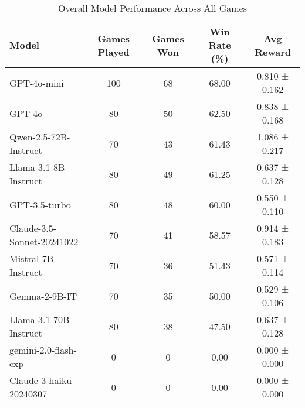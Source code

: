 \begin{table}[htbp]
\centering
\caption{Overall Model Performance Across All Games}
\begin{tabular}{lcccc}
\toprule
Model & Games Played & Games Won & Win Rate (\%) & Avg Reward \\
\midrule
GPT-4o-mini & 100 & 68 & 68.00 & 0.810 ± 0.162 \\
GPT-4o & 80 & 50 & 62.50 & 0.838 ± 0.168 \\
Qwen-2.5-72B-Instruct & 70 & 43 & 61.43 & 1.086 ± 0.217 \\
Llama-3.1-8B-Instruct & 80 & 49 & 61.25 & 0.637 ± 0.128 \\
GPT-3.5-turbo & 80 & 48 & 60.00 & 0.550 ± 0.110 \\
Claude-3.5-Sonnet-20241022 & 70 & 41 & 58.57 & 0.914 ± 0.183 \\
Mistral-7B-Instruct & 70 & 36 & 51.43 & 0.571 ± 0.114 \\
Gemma-2-9B-IT & 70 & 35 & 50.00 & 0.529 ± 0.106 \\
Llama-3.1-70B-Instruct & 80 & 38 & 47.50 & 0.637 ± 0.128 \\
gemini-2.0-flash-exp & 0 & 0 & 0.00 & 0.000 ± 0.000 \\
Claude-3-haiku-20240307 & 0 & 0 & 0.00 & 0.000 ± 0.000 \\
\bottomrule
\end{tabular}
\end{table}
